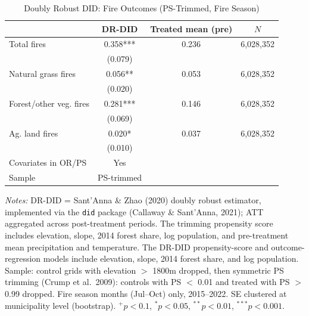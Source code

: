 \begin{table}[htbp]
\centering
\small
\caption{Doubly Robust DID: Fire Outcomes (PS-Trimmed, Fire Season)}
\label{tab:did_drdid_fire}
\begin{tabular}{lccc}
\toprule
 & DR-DID & Treated mean (pre) & $N$ \\
\midrule
Total fires & 0.358*** & 0.236 & 6,028,352 \\
 & (0.079) & & \\
[0.5em]
Natural grass fires & 0.056** & 0.053 & 6,028,352 \\
 & (0.020) & & \\
[0.5em]
Forest/other veg. fires & 0.281*** & 0.146 & 6,028,352 \\
 & (0.069) & & \\
[0.5em]
Ag. land fires & 0.020* & 0.037 & 6,028,352 \\
 & (0.010) & & \\
\midrule
Covariates in OR/PS & Yes & & \\
Sample & PS-trimmed & & \\
\bottomrule
\end{tabular}
\begin{tablenotes}[flushleft]
\small
\item \textit{Notes:} DR-DID = Sant'Anna \& Zhao (2020) doubly robust estimator, implemented via the \texttt{did} package (Callaway \& Sant'Anna, 2021); ATT aggregated across post-treatment periods. The trimming propensity score includes elevation, slope, 2014 forest share, log population, and pre-treatment mean precipitation and temperature. The DR-DID propensity-score and outcome-regression models include elevation, slope, 2014 forest share, and log population. Sample: control grids with elevation $>$ 1800m dropped, then symmetric PS trimming (Crump et al.\ 2009): controls with PS $<$ 0.01 and treated with PS $>$ 0.99 dropped. Fire season months (Jul--Oct) only, 2015--2022. SE clustered at municipality level (bootstrap). $^{+}p<0.1$, $^{*}p<0.05$, $^{**}p<0.01$, $^{***}p<0.001$.
\end{tablenotes}
\end{table}
